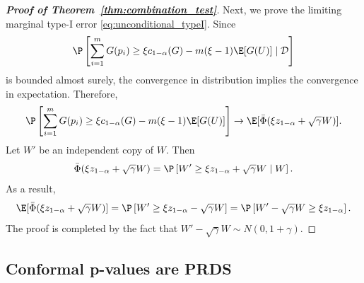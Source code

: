 \begin{proof}[\textbf{Proof of Theorem~\ref{thm:combination_test}}]
Next, we prove the limiting marginal type-I error \eqref{eq:unconditional_typeI}. Since $$\P\left[\sum_{i=1}^{m}G(p_i)\ge \xi c_{1 - \alpha}(G) - m(\xi - 1)\E[G(U)] \mid \mathcal{D} \right]$$ is bounded almost surely, the convergence in distribution implies the convergence in expectation. Therefore,
\[\P\left[\sum_{i=1}^{m}G(p_i)\ge \xi c_{1 - \alpha}(G) - m(\xi - 1)\E[G(U)]\right] \rightarrow \E[\bar{\Phi}(\xi z_{1 - \alpha} + \sqrt{\gamma}W)].\]
Let $W'$ be an independent copy of $W$. Then
\[\bar{\Phi}(\xi z_{1 - \alpha} + \sqrt{\gamma}W) = \P\left[ W' \ge \xi z_{1 - \alpha} + \sqrt{\gamma}W\mid W\right].\]
As a result,
\[\E[\bar{\Phi}(\xi z_{1 - \alpha} + \sqrt{\gamma}W)] = \P\left[W' \ge \xi z_{1 - \alpha} - \sqrt{\gamma}W \right] = \P\left[W' - \sqrt{\gamma}W\ge \xi z_{1 - \alpha} \right].\]
The proof is completed by the fact that $W' - \sqrt{\gamma}W\sim N(0, 1 + \gamma)$.

\end{proof}


\subsection{Conformal p-values are PRDS}\label{app:PRDS}

